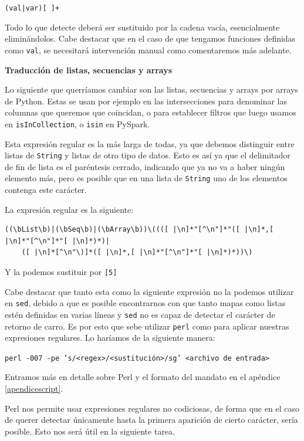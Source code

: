 \documentclass[12pt,twoside,titlepage]{report}
\begin{document}
\texttt{(val|var)[ ]+}

Todo lo que detecte deberá ser sustituido por la cadena vacía, esencialmente eliminándolos. Cabe destacar que en el caso de que tengamos funciones definidas como \texttt{val}, se necesitará intervención manual como comentaremos más adelante.

\textbf{Traducción de listas, secuencias y arrays}

Lo siguiente que querríamos cambiar son las listas, secuencias y arrays por arrays de Python. Estas se usan por ejemplo en las intersecciones para denominar las columnas que queremos que coincidan, o para establecer filtros que luego usamos en \texttt{isInCollection}, o \texttt{isin} en PySpark. 

Esta expresión regular es la más larga de todas, ya que debemos distinguir entre listas de \texttt{String} y listas de otro tipo de datos. Esto es así ya que el delimitador de fin de lista es el paréntesis cerrado, indicando que ya no va a haber ningún elemento más, pero es posible que en una lista de \texttt{String} uno de los elementos contenga este carácter.

La expresión regular es la siguiente:

\begin{Verbatim}[fontsize=\scriptsize,frame=single]
((\bList\b)|(\bSeq\b)|(\bArray\b))\((([ |\n]*"[^\n"]*"([ |\n]*,[ |\n]*"[^\n"]*"[ |\n]*)*)|
	([ |\n]*[^\n"\)]*([ |\n]*,[ |\n]*"[^\n"]*"[ |\n]*)*))\)
\end{Verbatim}

Y la podemos sustituir por \texttt{[5]}

Cabe destacar que tanto esta como la siguiente expresión no la podemos utilizar en \texttt{sed}, debido a que es posible encontrarnos con que tanto mapas como listas estén definidas en varias líneas y \texttt{sed} no es capaz de detectar el carácter de retorno de carro. Es por esto que sebe utilizar \texttt{perl} como para aplicar nuestras expresiones regulares. Lo haríamos de la siguiente manera:

\texttt{perl -007 -pe 's/<regex>/<sustitución>/sg' <archivo de entrada>}

Entramos más en detalle sobre Perl y el formato del mandato en el apéndice \ref{apendicescript}.

Perl nos permite usar expresiones regulares no codiciosas, de forma que en el caso de querer detectar únicamente hasta la primera aparición de cierto carácter, sería posible. Esto nos será útil en la siguiente tarea.
\end{document}
